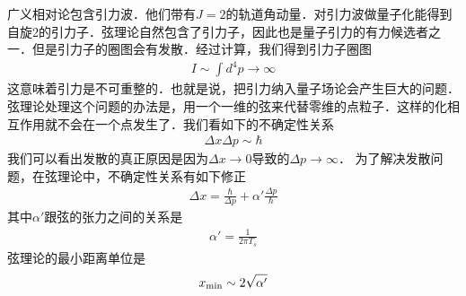  
\begin{issues}
\issueNeedCite
\issueMissDepend
\end{issues}
 
 广义相对论包含引力波．他们带有$J = 2$的轨道角动量．对引力波做量子化能得到自旋2的引力子．弦理论自然包含了引力子，因此也是量子引力的有力候选者之一．但是引力子的圈图会有发散．经过计算，我们得到引力子圈图
 \begin{align}
 I \sim \int d^4 p \rightarrow \infty 
 \end{align}
 这意味着引力是不可重整的．也就是说，把引力纳入量子场论会产生巨大的问题．弦理论处理这个问题的办法是，用一个一维的弦来代替零维的点粒子．这样的化相互作用就不会在一个点发生了．我们看如下的不确定性关系
 \begin{align}
\Delta x \Delta p \sim \hbar  
 \end{align}
我们可以看出发散的真正原因是因为$\Delta x \rightarrow 0$导致的$\Delta p \rightarrow  \infty  $．  为了解决发散问题，在弦理论中，不确定性关系有如下修正
\begin{align}
\Delta x  = \frac{\hbar}{\Delta p} + \alpha' \frac{\Delta p}{\hbar }
\end{align}
其中$\alpha'$跟弦的张力之间的关系是
\begin{align}
\alpha ' = \frac{1}{2 \pi T_s} 
\end{align}
弦理论的最小距离单位是
\begin{align}
x_{\rm min} \sim 2 \sqrt{\alpha'}
\end{align}

